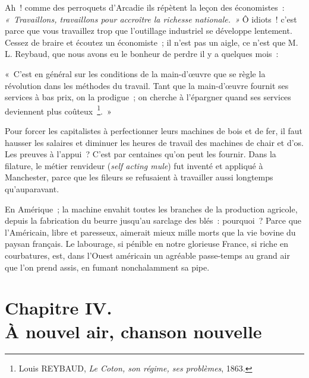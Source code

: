 \documentclass[french,twoside]{book} %
\newenvironment{quoteblock}%
  {\begin{quoting}}
  {\end{quoting}}
\newcommand\chapteropen{} %
\newcommand\chapterclose{} %
\newenvironment{quotebar}{%
    \def\FrameCommand{{\color{rubric!10!}\vrule width 0.5em} \hspace{0.9em}}%
    \def\OuterFrameSep{\itemsep} %
    \MakeFramed {\advance\hsize-\width \FrameRestore}
  }%
  {%
    \endMakeFramed
  }
\renewenvironment{quoteblock}%
  {%
    \savenotes
    \setstretch{0.9}
    \normalfont
    \begin{quotebar}
  }
  {%
    \end{quotebar}
    \spewnotes
  }
\begin{document}
Ah ! comme des perroquets d’Arcadie ils répètent la leçon des économistes : \emph{« Travaillons, travaillons pour accroître la richesse nationale. »} Ô idiots ! c’est parce que vous travaillez trop que l’outillage industriel se développe lentement. Cessez de braire et écoutez un économiste ; il n’est pas un aigle, ce n’est que M. L. Reybaud, que nous avons eu le bonheur de perdre il y a quelques mois :\par

\begin{quoteblock}
 \noindent « C’est en général sur les conditions de la main-d’œuvre que se règle la révolution dans les méthodes du travail. Tant que la main-d’œuvre fournit ses services à bas prix, on la prodigue ; on cherche à l’épargner quand ses services deviennent plus coûteux \footnote{Louis REYBAUD, \emph{Le Coton, son régime, ses problèmes}, 1863.}. »
\end{quoteblock}

\noindent Pour forcer les capitalistes à perfectionner leurs machines de bois et de fer, il faut hausser les salaires et diminuer les heures de travail des machines de chair et d’os. Les preuves à l’appui ? C’est par centaines qu’on peut les fournir. Dans la filature, le métier renvideur (\emph{self acting mule}) fut inventé et appliqué à Manchester, parce que les fileurs se refusaient à travailler aussi longtemps qu’auparavant.\par
En Amérique ; la machine envahit toutes les branches de la production agricole, depuis la fabrication du beurre jusqu’au sarclage des blés : pourquoi ? Parce que l’Américain, libre et paresseux, aimerait mieux mille morts que la vie bovine du paysan français. Le labourage, si pénible en notre glorieuse France, si riche en courbatures, est, dans l’Ouest américain un agréable passe-temps au grand air que l’on prend assis, en fumant nonchalamment sa pipe.
\chapterclose


\chapteropen
\chapter[{Chapitre IV. À nouvel air, chanson nouvelle}]{Chapitre IV. \\
À nouvel air, chanson nouvelle}\renewcommand{\leftmark}{Chapitre IV. \\
À nouvel air, chanson nouvelle}
\end{document}
